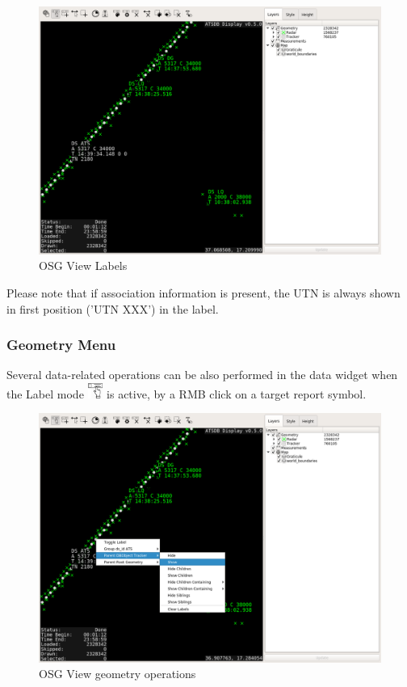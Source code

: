 \begin{figure}[H]
    \hspace*{-2.5cm}
    \includegraphics[width=19cm,frame]{../screenshots/osgview_labels.png}
  \caption{OSG View Labels}
\end{figure}

Please note that if association information is present, the UTN is always shown in first position ('UTN XXX') in the label.

\subsubsection{Geometry Menu}

Several data-related operations can be also performed in the data widget when the Label mode \includegraphics[width=0.5cm,frame]{../../data/icons/label_action.png} is active, by a RMB click on a target report symbol.

\begin{figure}[H]
    \hspace*{-2.5cm}
    \includegraphics[width=19cm,frame]{../screenshots/osgview_data_operations.png}
  \caption{OSG View geometry operations}
\end{figure}

